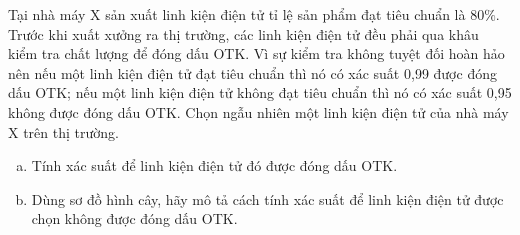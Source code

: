 \begin{bt}%
	Tại nhà máy X sản xuất linh kiện điện tử tỉ lệ sản phẩm đạt tiêu chuẩn là $80 \%$. Trước khi xuất xưởng ra thị trường, các linh kiện điện tử đều phải qua khâu kiểm tra chất lượng để đóng dấu OTK. Vì sự kiểm tra không tuyệt đối hoàn hảo nên nếu một linh kiện điện tử đạt tiêu chuẩn thì nó có xác suất 0{,}99 được đóng dấu OTK; nếu một linh kiện điện tử không đạt tiêu chuẩn thì nó có xác suất 0{,}95 không được đóng dấu OTK. Chọn ngẫu nhiên một linh kiện điện tử của nhà máy X trên thị trường.
	\begin{enumerate}[a)]
		\item Tính xác suất để linh kiện điện tử đó được đóng dấu OTK.
		\item Dùng sơ đồ hình cây, hãy mô tả cách tính xác suất để linh kiện điện tử được chọn không được đóng dấu OTK.
	\end{enumerate}
	

\end{bt}

